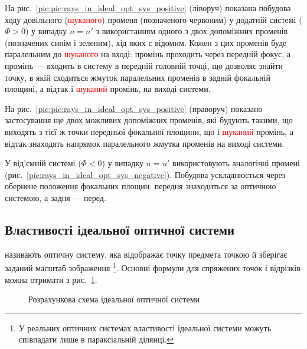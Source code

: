 На рис.~\ref{pic:pic:rays_in_ideal_opt_sys_positive} (ліворуч) показана побудова ходу довільного (\textcolor{red}{шуканого}) променя (позначеного червоним) у додатній системі ($\Phi > 0$) у випадку $ n = n'$ з використанням одного з двох допоміжних променів (позначених синім і зеленим), хід яких є відомим. Кожен з цих променів буде паралельним до \textcolor{red}{шуканого} на вході: промінь \bluerayT{} проходить через передній фокус, а промінь \greenrayT{} --- входить в систему в передній головній точці, що дозволяє знайти точку, в якій сходиться жмуток паралельних променів в задній фокальній площині, а відтак і \textcolor{red}{шуканий} промінь, на виході системи.


На рис.~\ref{pic:pic:rays_in_ideal_opt_sys_positive} (праворуч) показано застосування ще двох можливих допоміжних променів, які будують такими, що виходять з тієї ж точки передньої фокальної площини, що і \textcolor{red}{шуканий} промінь, а відтак знаходять напрямок паралельного жмутка променів на
виході системи.



У від'ємній системі ($\Phi < 0$) у випадку $ n = n' $ використовують аналогічні промені (рис.~\ref{pic:rays_in_ideal_opt_sys_negative}). Побудова ускладнюється через обернене положення фокальних
площин: передня знаходиться за оптичною системою, а задня --- перед.


\subsection{Властивості ідеальної оптичної системи}

 називають оптичну систему, яка
відображає точку предмета точкою й зберігає заданий масштаб
зображення \footnote{У реальних оптичних системах властивості ідеальної системи можуть співпадати лише в параксіальній ділянці.}. Основні формули для спряжених точок і відрізків можна отримати з рис.~\ref{pic:Ideal_opt_sys}.


\begin{figure}[h!]\centering
	
	\caption{Розрахункова схема ідеальної оптичної системи}
	\label{pic:Ideal_opt_sys}
\end{figure}

